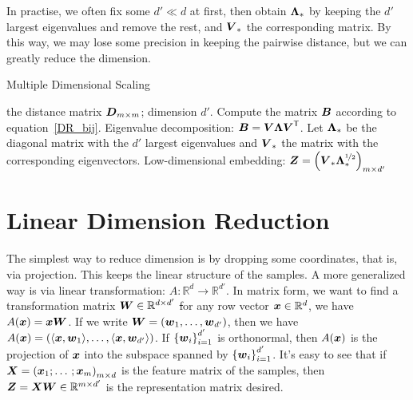 In practise, we often fix some $d' \ll d$ at first, then obtain $\boldsymbol{\Lambda}_*$ by keeping the $d'$ largest 
eigenvalues and remove the rest, and $\boldsymbol{V}_*$ the corresponding matrix. By this way, we may lose some 
precision in keeping the pairwise distance, but we can greatly reduce the dimension.

\begin{algorithm}
    \caption{Multiple Dimensional Scaling}
    \begin{algorithmic}[1]
        \Require the distance matrix $\boldsymbol{D}_{m \times m}$; dimension $d'$.
        \State Compute the matrix $\boldsymbol{B}$ according to equation~\eqref{DR_bij}.
        \State Eigenvalue decomposition: $\boldsymbol{B} = \boldsymbol{V} \boldsymbol{\Lambda}{\boldsymbol{V}}^\mathsf{T}$.
        \State Let $\boldsymbol{\Lambda}_*$ be the diagonal matrix with the $d'$ largest eigenvalues and $\boldsymbol{V}_*$ the
        matrix with the corresponding eigenvectors.
        \Ensure Low-dimensional embedding: $\boldsymbol{Z} = {\left(\boldsymbol{V}_* \boldsymbol{\Lambda}_*^{\nicefrac{1}{2}}\right)}_{m 
        \times d'}$
    \end{algorithmic}
\end{algorithm}

\section{Linear Dimension Reduction}
The simplest way to reduce dimension is by dropping some coordinates, that is, via projection. This keeps the
linear structure of the samples. A more generalized way is via linear transformation: $A: \mathbb{R}^d 
\longrightarrow \mathbb{R}^{d'}$. In matrix form, we want to find a transformation matrix 
$\boldsymbol{W} \in \mathbb{R}^{d \times d'}$ \st for any row vector $\boldsymbol{x} \in \mathbb{R}^d$, we have
$A(\boldsymbol{x}) = \boldsymbol{x} \boldsymbol{W}$. If we write $\boldsymbol{W} = \left(\boldsymbol{w}_1, \dotsc, \boldsymbol{w}_{d'}\right)$, then we have
$A(\boldsymbol{x}) = \left(\langle \boldsymbol{x}, \boldsymbol{w}_1\rangle, \dotsc, \langle \boldsymbol{x}, \boldsymbol{w}_{d'}\rangle\right)$. If
${\left\{\boldsymbol{w}_i\right\}}_{i=1}^{d'}$ is orthonormal, then $A(\boldsymbol{x})$ is the projection of $\boldsymbol{x}$ into the
subspace spanned by ${\left\{\boldsymbol{w}_i\right\}}_{i=1}^{d'}$. It's easy to see that if 
$\boldsymbol{X} = {\left(\boldsymbol{x}_1; \dotsc; \boldsymbol{x}_m\right)}_{m \times d}$ is the feature matrix of the samples, then 
$\boldsymbol{Z} = \boldsymbol{X} \boldsymbol{W} \in \mathbb{R}^{m \times d'}$ is the representation matrix desired.


